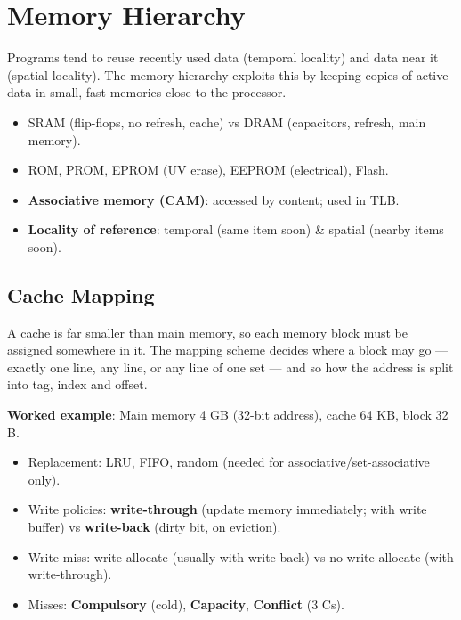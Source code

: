\needspace{125pt}

\hypertarget{p2-02--9-memory-hierarchy}{%
\section{Memory Hierarchy}\label{p2-02--9-memory-hierarchy}}

Programs tend to reuse recently used data (temporal locality) and data near it (spatial locality). The
memory hierarchy exploits this by keeping copies of active data in small, fast memories close to the
processor.



\begin{itemize}
\tightlist
\item
  SRAM (flip-flops, no refresh, cache) vs DRAM (capacitors, refresh, main memory).
\item
  ROM, PROM, EPROM (UV erase), EEPROM (electrical), Flash.
\item
  \textbf{Associative memory (CAM)}: accessed by content; used in TLB.
\item
  \textbf{Locality of reference}: temporal (same item soon) \& spatial (nearby items soon).
\end{itemize}

\needspace{125pt}

\hypertarget{p2-02--91-cache-mapping}{%
\subsection{Cache Mapping}\label{p2-02--91-cache-mapping}}

A cache is far smaller than main memory, so each memory block must be assigned somewhere in it. The mapping
scheme decides where a block may go --- exactly one line, any line, or any line of one set --- and so how the
address is split into tag, index and offset.



\textbf{Worked example}: Main memory 4 GB (32-bit address), cache 64 KB, block 32 B.





\begin{itemize}
\tightlist
\item
  Replacement: LRU, FIFO, random (needed for associative/set-associative only).
\item
  Write policies: \textbf{write-through} (update memory immediately; with write buffer) vs \textbf{write-back} (dirty bit, on eviction).
\item
  Write miss: write-allocate (usually with write-back) vs no-write-allocate (with write-through).
\item
  Misses: \textbf{Compulsory} (cold), \textbf{Capacity}, \textbf{Conflict} (3 Cs).
\end{itemize}

